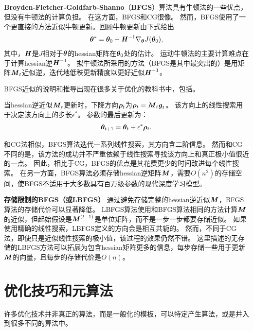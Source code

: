 \subsection{}
\label{sec:bfgs}
\textbf{Broyden-Fletcher-Goldfarb-Shanno}（\textbf{\gls{BFGS}}）算法具有牛顿法的一些优点，但没有牛顿法的计算负担。
在这方面，\gls{BFGS}和CG很像。
然而，\gls{BFGS}使用了一个更直接的方法近似牛顿更新。回顾牛顿更新由下式给出
\begin{equation}
    \boldsymbol{\theta}^* = \boldsymbol{\theta}_0 - \boldsymbol{\mathit{H}}^{-1} \nabla_{\boldsymbol{\theta}} J(\boldsymbol{\theta}_0),
\end{equation}
其中，$\boldsymbol{\mathit{H}}$是$J$相对于$\boldsymbol{\theta}$的\gls{hessian}矩阵在$\boldsymbol{\theta}_0$处的估计。
运动牛顿法的主要计算难点在于计算\gls{hessian}逆$\boldsymbol{\mathit{H}}^{-1}$。
拟牛顿法所采用的方法（\gls{BFGS}是其中最突出的）是用矩阵$\boldsymbol{\mathit{M}}_t$近似逆，迭代地低秩更新精度以更好近似$\boldsymbol{\mathit{H}}^{-1}$。


\gls{BFGS}近似的说明和推导出现在很多关于优化的教科书中，包括\cite{Lue84}。

当\gls{hessian}逆近似$\boldsymbol{\mathit{M}}_t$更新时，下降方向$\boldsymbol{\rho}_t$为$\boldsymbol{\rho}_t = \boldsymbol{\mathit{M}}_t \boldsymbol{\mathit{g}}_t$。
该方向上的线性搜索用于决定该方向上的步长$\epsilon^*$。
参数的最后更新为：
\begin{equation}
    \boldsymbol{\theta}_{t+1} = \boldsymbol{\theta}_t + \epsilon^* \boldsymbol{\rho}_t.
\end{equation}

和\gls{CG}法相似，\gls{BFGS}算法迭代一系列线性搜索，其方向含二阶信息。
然而和\gls{CG}不同的是，该方法的成功并不严重依赖于线性搜索寻找该方向上和真正极小值很近的一点。
因此，相比于\gls{CG}，\gls{BFGS}的优点是其花费更少的时间改进每个线性搜索。
在另一方面，\gls{BFGS}算法必须存储\gls{hessian}逆矩阵$\boldsymbol{\mathit{M}}$，需要$O(n^2)$的存储空间，使\gls{BFGS}不适用于大多数具有百万级参数的现代深度学习模型。

\textbf{存储限制的\gls{BFGS}（或\gls{LBFGS}）}
通过避免存储完整的\gls{hessian}逆近似$\boldsymbol{\mathit{M}}$，\gls{BFGS}算法的存储代价可以显著降低。
\gls{LBFGS}算法使用和\gls{BFGS}算法相同的方法计算$\boldsymbol{\mathit{M}}$的近似，但起始假设是$\boldsymbol{\mathit{M}}^{(t-1)}$是单位矩阵，而不是一步一步都要存储近似。
如果使用精确的线性搜索，\gls{LBFGS}定义的方向会是相互共轭的。
然而，不同于\gls{CG}法，即使只是近似线性搜索的极小值，该过程的效果仍然不错。
这里描述的无存储的\gls{LBFGS}方法可以拓展为包含\gls{hessian}矩阵更多的信息，每步存储一些用于更新$\boldsymbol{\mathit{M}}$的向量，且每步的存储代价是$O(n)$。


\section{优化技巧和元算法}
\label{sec:optimization_strategies_and_meta_algorithms}
许多优化技术并非真正的算法，而是一般化的模板，可以特定产生算法，或是并入到很多不同的算法中。

